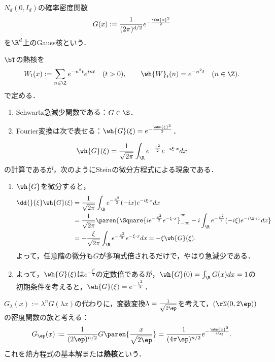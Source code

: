 \documentclass[uplatex,dvipdfmx]{jsreport}
\begin{document}
\begin{definition}
    $N_d(0,I_d)$の確率密度関数
    \[G(x):=\frac{1}{(2\pi)^{d/2}}e^{-\frac{\abs{x}^2}{2}}\]
    を$\R^d$上のGauss核という．
\end{definition}
\begin{remarks}\label{remarks-Gauss-kernel-on-T}
    $\bT$の熱核を
    \[W_t(x):=\sum_{n\in\Z}e^{-n^2t}e^{int}\quad(t>0),\qquad \wh{W}_t(n)=e^{-n^2t}\quad(n\in\Z).\]
    で定める．
\end{remarks}

\begin{theorem}[Gauss核のFourier変換]\mbox{}\label{thm-Fourier-transform-of-Gaussian-kernel-on-R}
    \begin{enumerate}
        \item Schwartz急減少関数である：$G\in\S$．
        \item Fourier変換は次で表せる：$\wh{G}(\xi)=e^{-\frac{\abs{\xi}^2}{2}}$．
    \end{enumerate}
\end{theorem}
\begin{Proof}
    \[\wh{G}(\xi)=\frac{1}{\sqrt{2\pi}}\int_\R e^{-\frac{x^2}{2}}e^{-i\xi\cdot x}dx\]
    の計算であるが，次のようにSteinの微分方程式による現象である．
    \begin{enumerate}
        \item $\wh{G}$を微分すると，
        \begin{align*}
            \dd{}{\xi}\wh{G}(\xi)&=\frac{1}{\sqrt{2\pi}}\int_\R e^{-\frac{x^2}{2}}(-ix)e^{-i\xi\cdot  x}dx\\
            &=\frac{1}{\sqrt{2\pi}}\paren{\Square{ie^{-\frac{x^2}{2}}e^{-\xi\cdot  x}}^\infty_{-\infty}-i\int_\R e^{-\frac{x^2}{2}}(-i\xi)e^{-i\x\cdot i x}dx}\\
            &=-\frac{\xi}{\sqrt{2\pi}}\int_\R e^{-\frac{x^2}{2}}e^{-\xi\cdot  x}dx=-\xi\wh{G}(\xi).
        \end{align*}
        よって，任意階の微分も$G$が多項式倍されるだけで，やはり急減少である．
        \item よって，$\wh{G}(\xi)$は$e^{-\frac{\xi^2}{2}}$の定数倍であるが，$\wh{G}(0)=\int_\R G(x)dx=1$の初期条件を考えると，$\wh{G}(\xi)=e^{-\frac{\xi^2}{2}}$．
    \end{enumerate}
\end{Proof}

\begin{remarks}[Gauss核が定める総和核]
    $G_\lambda(x):=\lambda^nG(\lambda x)$の代わりに，変数変換$\lambda=\frac{1}{\sqrt{2\ep}}$を考えて，$(\rN(0,2\ep))$の密度関数の族と考える：
    \[G_\ep(x):=\frac{1}{(2\ep)^{n/2}}G\paren{\frac{x}{\sqrt{2\ep}}}=\frac{1}{(4\pi\ep)^{n/2}}e^{-\frac{\abs{x}^2}{4\ep}}.\]
    これを熱方程式の基本解または\textbf{熱核}という．
\end{remarks}
\end{document}
